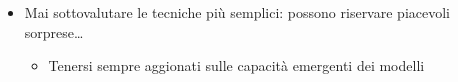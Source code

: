 \begin{frame}[t]
{\begin{minipage}[t]{\textwidth}
\begin{itemize}[leftmargin=10pt,align=right]
\begin{itemize}[leftmargin=10pt,align=right]
                \item[\alert{\alert{\faArrowCircleRight}}] Evitare che il LLM debba chiedersi cosa è permesso generare se messo davanti ad una lista di vincoli
                \item[\alert{\alert{\faArrowCircleRight}}] Gli LLM tendono a trovare scappatoie (ciò che non è esplicitamente vietato è permesso\ldots)
            \end{itemize}
            \item[\alert{\faArrowCircleRight}] \alert{Mai sottovalutare le tecniche più semplici:} possono riservare piacevoli sorprese\ldots
            \begin{itemize}[leftmargin=10pt,align=right]
                \item[\alert{\alert{\faArrowCircleRight}}] Tenersi sempre aggionati sulle capacità emergenti dei modelli
            \end{itemize}
        \end{itemize}
    \end{minipage}
}
\end{frame}
%
